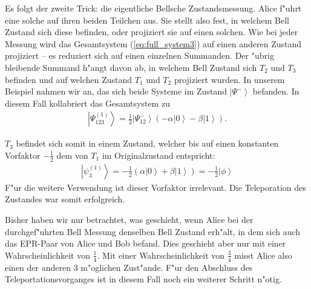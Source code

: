 \begin{refsection}
Es folgt der zweite Trick: die eigentliche Bellsche Zustandsmessung. Alice f"uhrt eine solche auf ihren beiden Teilchen aus. Sie stellt also fest, in welchem Bell Zustand sich diese befinden, oder projiziert sie auf einen solchen. Wie bei jeder Messung wird das Gesamtsystem (\ref{eq:full_system3}) auf einen anderen Zustand projiziert -- es reduziert sich auf einen einzelnen Summanden. Der "ubrig bleibende Summand h"angt davon ab, in welchem Bell Zustand sich $T_{2}$ und $T_{3}$ befinden und auf welchen Zustand $T_{1}$ und $T_{2}$ projiziert wurden. In unserem Beispiel nahmen wir an, das sich beide Systeme im Zustand $\left|\Psi^{-}\right\rangle$ befanden. In diesem Fall kollabriert das Gesamtsystem zu
\begin{align}
\left| \Psi_{123}^{(1)} \right\rangle = \frac{1}{2} \left| \Psi_{12}^{-} \right \rangle (-\alpha \left| 0 \right \rangle - \beta \left| 1 \right\rangle).
\end{align}

$T_{3}$ befindet sich somit in einem Zustand, welcher bis auf einen konstanten Vorfaktor $-\frac{1}{2}$ dem von $T_{1}$ im Originalzustand entspricht:
\begin{align}
\left| \psi_{3}^{(1)} \right\rangle = - \frac{1}{2} \left( \alpha \left| 0 \right \rangle + \beta \left| 1 \right \rangle \right ) = - \frac{1}{2} \left| \phi \right \rangle
\end{align}
F"ur die weitere Verwendung ist dieser Vorfaktor irrelevant. Die Teleporation des Zustandes war somit erfolgreich. 

Bisher haben wir  nur betrachtet, was geschieht, wenn Alice bei der durchgef"uhrten Bell Messung denselben Bell Zustand erh"alt, in dem sich auch das EPR-Paar von Alice und Bob befand. Dies geschieht aber nur mit einer Wahrscheinlichkeit von $\frac{1}{4}$. Mit einer Wahrscheinlichkeit von $\frac{3}{4}$ misst Alice also einen der anderen 3 m"oglichen Zust"ande. F"ur den Abschluss des Teleportationsvorganges ist in diesem Fall noch ein weiterer Schritt n"otig.


\end{refsection}
